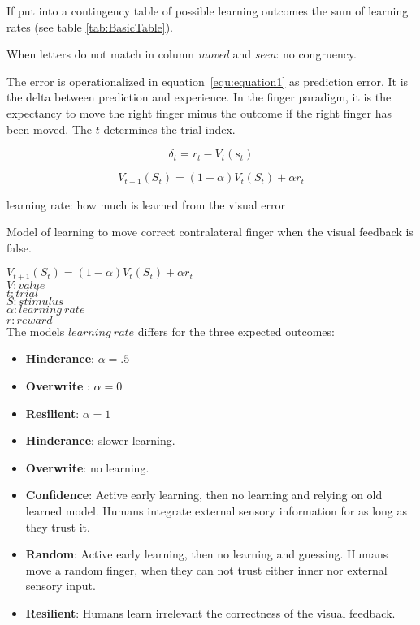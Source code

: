 \documentclass[man]{apa7}
\begin{document}
If put into a contingency table of possible learning outcomes the sum of learning rates (see table \ref{tab:BasicTable}).

When letters do not match in column \textit{moved} and \textit{seen}: no congruency.

The error is operationalized in equation~\ref{equ:equation1} as prediction error. It is the delta between prediction and experience. In the finger paradigm, it is the expectancy to move the right finger minus the outcome if the right finger has been moved. The $t$ determines the trial index.

\begin{equation} \label{equation1}
\delta_t = r_t - V_t(s_t)
\label{equ:equation1}
\end{equation}

\begin{equation} \label{equation2}
V_{t+1}(S_t)=(1-\alpha)V_t(S_t)+\alpha r_t    
\label{equ:equation2}
\end{equation}








learning rate: how much is learned from the visual error

Model of learning to move correct contralateral finger when the visual feedback is false.

$V_{t+1}(S_t)=(1-\alpha)V_t(S_t)+\alpha r_t$ \\
$V: value$ \\
$t: trial$ \\
$S: stimulus$ \\
$\alpha: learning\:rate$ \\
$r: reward$ \\

The models $learning\:rate$ differs for the three expected outcomes:
\begin{itemize}
    \item \textbf{Hinderance}: $\alpha = .5$
    \item \textbf{Overwrite} : $\alpha = 0$
    \item \textbf{Resilient}: $\alpha = 1$
\end{itemize}   

\begin{itemize}
    \item \textbf{Hinderance}: slower learning.
    \item \textbf{Overwrite}: no learning.
    \item \textbf{Confidence}: Active early learning, then no learning and relying on old learned model. Humans integrate external sensory information for as long as they trust it.
    \item \textbf{Random}: Active early learning, then no learning and guessing. Humans move a random finger, when they can not trust either inner nor external sensory input.
    \item \textbf{Resilient}: Humans learn irrelevant the correctness of the visual feedback.
\end{itemize}
\end{document}
